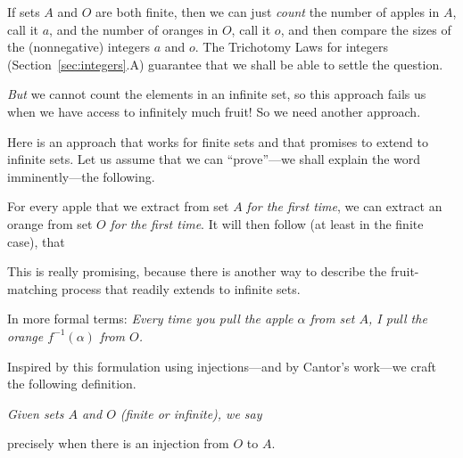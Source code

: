 If sets $A$ and $O$ are both finite, then we can just {\em count} the number of apples in $A$, call it $a$, and the number of oranges in $O$, call it $o$, and then compare the sizes of the (nonnegative) integers $a$ and $o$.  The Trichotomy Laws for integers (Section~\ref{sec:integers}.A) guarantee that we shall be able to settle the question.

\smallskip

\noindent
{\em But} we cannot count the elements in an infinite set, so this approach fails us when we have access to infinitely much fruit!  So we need another approach.

\medskip

Here is an approach that works for finite sets and that promises to extend to infinite sets.  Let us assume that we can ``prove''---we shall explain the word imminently---the following.

For every apple that we extract from set $A$ {\em for the first time}, we can extract an orange from set $O$ {\em for the first time}.  It will then follow (at least in the finite case), that \\
\hspace*{.35in}{\em There are at least as many oranges as apples!}

\medskip

\noindent
This is really promising, because there is another way to describe the fruit-matching process that readily extends to infinite sets. \\

\noindent
In more formal terms: {\em Every time you pull the apple $\alpha$ from set $A$, I pull the orange $f^{-1}(\alpha)$ from $O$.}

\medskip

Inspired by this formulation using injections---and by Cantor's work---we craft the following definition.

\bigskip

\noindent
{\em
Given sets $A$ and $O$ (finite or infinite), we say \\
\hspace*{.35in}{\em Set $O$ is at least as big as set $A$, denoted $|O| \geq |A|$}

\noindent
precisely when there is an injection from $O$ to $A$.}

